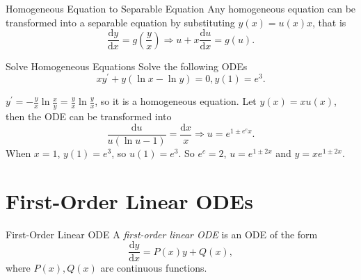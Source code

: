 \begin{proposition}{Homogeneous Equation to Separable Equation}{}
  Any homogeneous equation can be transformed into a separable equation
  by substituting $y(x) = u(x)x$, that is
  \begin{equation}
    \frac{\mathrm{d} y}{\mathrm{d} x} = g \left( \frac{y}{x} \right)
    \Rightarrow
    u + x \frac{\mathrm{d}u}{\mathrm{d} x} = g(u).
  \end{equation}
\end{proposition}

\begin{example}{Solve Homogeneous Equations}{}
  Solve the following ODEs
  \begin{equation}
    xy^{\prime} + y(\ln x - \ln y) = 0, y(1) = e^3.
  \end{equation}
\end{example}

\begin{solution}
  $y^{\prime} = - \frac{y}{x} \ln \frac{x}{y} = \frac{y}{x} \ln \frac{y}{x}$, so it is a homogeneous equation.
  Let $y(x) = x u(x)$, then the ODE can be transformed into
  \begin{equation}
    \frac{\mathrm{d} u}{u(\ln u - 1)} = \frac{\mathrm{d} x}{x}
    \Rightarrow
    u = e^{1 \pm e^c x}.
  \end{equation}
  When $x = 1$, $y(1) = e^3$, so $u(1) = e^3$. So $e^c = 2$, $u = e^{1\pm 2x}$
  and $y = x e^{1 \pm 2x}$.
\end{solution}


\section{First-Order Linear ODEs}

\begin{definition}{First-Order Linear ODE}{}
  A \emph{first-order linear ODE} is an ODE of the form
  \begin{equation}
    \frac{\mathrm{d} y}{\mathrm{d} x} = P(x) y + Q(x),
  \end{equation}
  where $P(x), Q(x)$ are continuous functions.
\end{definition}

